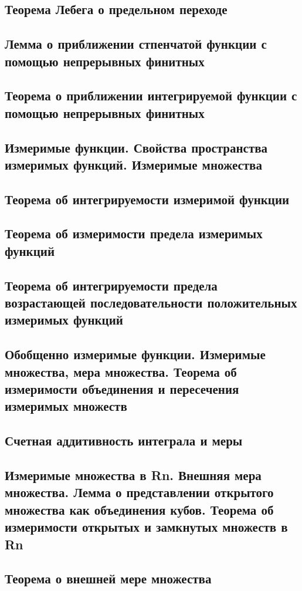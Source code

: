 \documentclass[a4paper]{article}
\theoremstyle{definition}
\theoremstyle{remark}
\begin{document}
    \subsection{ Теорема Лебега о предельном переходе}
    \subsection{ Лемма о приближении стпенчатой функции с помощью непрерывных финитных}
    \subsection{ Теорема о приближении интегрируемой функции с помощью непрерывных финитных}
    \subsection{ Измеримые функции. Свойства пространства измеримых функций. Измеримые множества}
    \subsection{ Теорема об интегрируемости измеримой функции}
    \subsection{ Теорема об измеримости предела измеримых функций}
    \subsection{ Теорема об интегрируемости предела возрастающей
    последовательности положительных измеримых функций}
    \subsection{ Обобщенно измеримые функции. Измеримые множества, мера множества. Теорема об измеримости объединения и пересечения измеримых множеств}
    \subsection{ Счетная аддитивность интеграла и меры}
    \subsection{ Измеримые множества в Rn. Внешняя мера множества. Лемма о представлении открытого множества как объединения кубов. Теорема об измеримости открытых и замкнутых множеств в Rn}
    \subsection{ Теорема о внешней мере множества}
\end{document}
